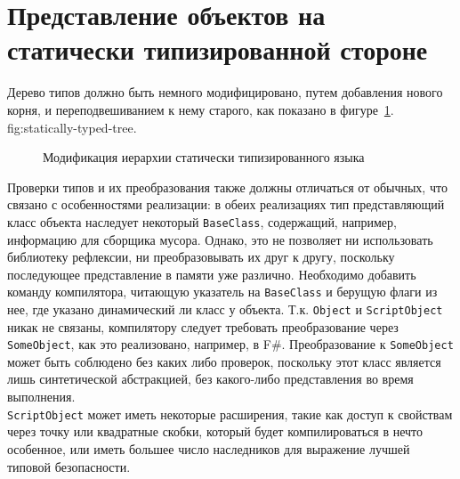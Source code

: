 \documentclass[times,specification,annotation]{itmo-student-thesis}
\begin{document}
\section{Представление объектов на статически типизированной стороне}
Дерево типов должно быть немного модифицировано, путем добавления нового корня, и переподвешиванием к нему старого, как показано в фигуре~\ref{fig:statically-typed-tree}.
{fig:statically-typed-tree}.
\begin{figure}[!h]
	\caption{Модификация иерархии статически типизированного языка}\label{fig:statically-typed-tree}
	\centering
	
\end{figure}
Проверки типов и их преобразования также должны отличаться от обычных, что связано с особенностями реализации: в обеих реализациях тип представляющий класс объекта наследует некоторый \texttt{BaseClass}, содержащий, например, информацию для сборщика мусора. Однако, это не позволяет ни использовать библиотеку рефлексии, ни преобразовывать их друг к другу, поскольку последующее представление в памяти уже различно. Необходимо добавить команду компилятора, читающую указатель на \texttt{BaseClass} и берущую флаги из нее, где указано динамический ли класс у объекта. Т.к. \texttt{Object} и \texttt{ScriptObject} никак не связаны, компилятору следует требовать преобразование через \texttt{SomeObject}, как это реализовано, например, в F\#. Преобразование к \texttt{SomeObject} может быть соблюдено без каких либо проверок, поскольку этот класс является лишь синтетической абстракцией, без какого-либо представления во время выполнения.\\
\texttt{ScriptObject} может иметь некоторые расширения, такие как доступ к свойствам через точку или квадратные скобки, который будет компилироваться в нечто особенное, или иметь большее число наследников для выражение лучшей типовой безопасности.
\end{document}

